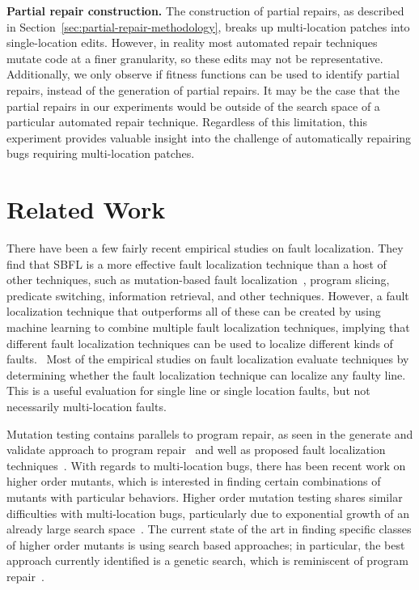 \documentclass[sigconf, timestamp-false, anonymous=true]{acmart}
\begin{document}
\vspace{1ex}
\noindent\textbf{Partial repair construction.}
The construction of partial repairs, as described in
Section~\ref{sec:partial-repair-methodology}, breaks up multi-location patches
into single-location edits. However, in
reality most automated repair techniques mutate code at a finer granularity, so
these edits may not be representative.  Additionally, we only observe if fitness
functions can be used to identify partial repairs,
instead of the generation of partial repairs. It may be the case that the
partial repairs in our experiments would be outside of the search space of a
particular automated repair technique.
Regardless of this limitation, this experiment provides valuable 
insight into the challenge of automatically repairing bugs requiring
multi-location patches.

\section{Related Work}
\label{sec:related}

There have been a few fairly recent empirical studies on fault localization. They find that 
SBFL is a more effective fault localization technique than a host of other techniques, such as 
mutation-based fault localization~\cite{pearson2017evaluating, mut-analysis}, program 
slicing, predicate switching,  information retrieval, and other techniques. 
However, a fault localization 
technique that outperforms all of these can be created by using machine learning to combine 
multiple fault localization techniques, implying that different fault localization techniques can 
be used to localize different kinds of faults.~\cite{zou2019empirical} Most of the empirical 
studies on fault localization evaluate techniques by determining whether the fault localization 
technique can localize any faulty line. This is a useful evaluation for single line or single 
location faults, but not necessarily multi-location faults.

Mutation testing contains parallels to program repair, as seen in the generate and validate 
approach to program repair~\cite{weimer2013leveraging} and well as proposed fault 
localization techniques~\cite{metallaxis,muse,mbfl-survey}. With regards to multi-location 
bugs, there has been recent work on higher order mutants, which is interested in finding 
certain combinations of mutants with particular behaviors. Higher order mutation testing 
shares similar difficulties with multi-location bugs, particularly due to exponential growth of 
an already large search 
space~\cite{long-search-spaces}. The current state of the art in finding specific classes of 
higher order mutants is using search based approaches; in particular, the best approach 
currently identified is a genetic search, which is reminiscent of program repair~\cite{homs, 
genprog}.
\end{document}

